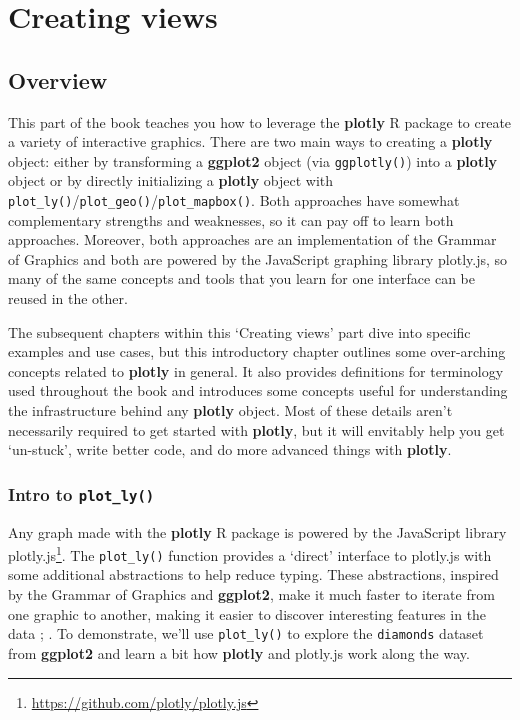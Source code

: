 \documentclass[
  12pt,
]{krantz}
\renewcommand{\href}[2]{#2\footnote{\url{#1}}}
\begin{document}
\hypertarget{part-creating-views}{%
\part{Creating views}\label{part-creating-views}}

\hypertarget{overview}{%
\chapter{Overview}\label{overview}}

This part of the book teaches you how to leverage the \textbf{plotly} R package to create a variety of interactive graphics. There are two main ways to creating a \textbf{plotly} object: either by transforming a \textbf{ggplot2} object (via \texttt{ggplotly()}) into a \textbf{plotly} object or by directly initializing a \textbf{plotly} object with \texttt{plot\_ly()}/\texttt{plot\_geo()}/\texttt{plot\_mapbox()}. Both approaches have somewhat complementary strengths and weaknesses, so it can pay off to learn both approaches. Moreover, both approaches are an implementation of the Grammar of Graphics and both are powered by the JavaScript graphing library plotly.js, so many of the same concepts and tools that you learn for one interface can be reused in the other.

The subsequent chapters within this `Creating views' part dive into specific examples and use cases, but this introductory chapter outlines some over-arching concepts related to \textbf{plotly} in general. It also provides definitions for terminology used throughout the book and introduces some concepts useful for understanding the infrastructure behind any \textbf{plotly} object. Most of these details aren't necessarily required to get started with \textbf{plotly}, but it will envitably help you get `un-stuck', write better code, and do more advanced things with \textbf{plotly}.

\hypertarget{intro-plotly}{%
\section{\texorpdfstring{Intro to \texttt{plot\_ly()}}{Intro to plot\_ly()}}\label{intro-plotly}}

Any graph made with the \textbf{plotly} R package is powered by the JavaScript library \href{https://github.com/plotly/plotly.js}{plotly.js}. The \texttt{plot\_ly()} function provides a `direct' interface to plotly.js with some additional abstractions to help reduce typing. These abstractions, inspired by the Grammar of Graphics and \textbf{ggplot2}, make it much faster to iterate from one graphic to another, making it easier to discover interesting features in the data \citep{Wilkinson:2005}; \citep{ggplot2}. To demonstrate, we'll use \texttt{plot\_ly()} to explore the \texttt{diamonds} dataset from \textbf{ggplot2} and learn a bit how \textbf{plotly} and plotly.js work along the way.
\end{document}
